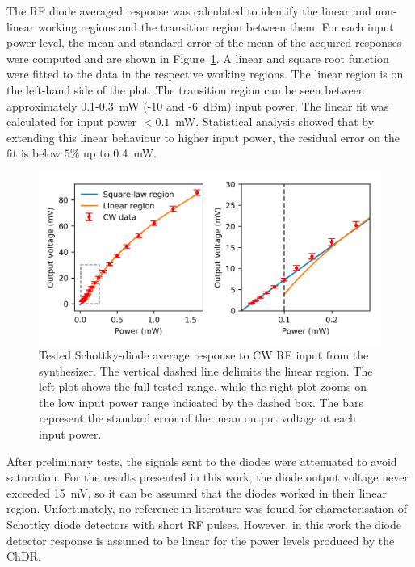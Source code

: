 The RF diode averaged response was calculated to identify the linear and non-linear working regions and the transition region between them. For each input power level, the mean and standard error of the mean of the acquired responses were computed and are shown in Figure~\ref{fig:diode_cal_fits}. A linear and square root function were fitted to the data in the respective working regions. The linear region is on the left-hand side of the plot. The transition region can be seen between approximately 0.1-0.3~mW (-10 and -6~dBm) input power. The linear fit was calculated for input power $<0.1$~mW. Statistical analysis showed that by extending this linear behaviour to higher input power, the residual error on the fit is below $5\%$ up to 0.4~mW.



\begin{figure}[!t]
\centering
\includegraphics[scale=1, keepaspectratio]{pictures/diode_cal_fit3}
\caption{Tested Schottky-diode average response to CW RF input from the synthesizer. The vertical dashed line delimits the linear region. The left plot shows the full tested range, while the right plot zooms on the low input power range indicated by the dashed box. The bars represent the standard error of the mean output voltage at each input power.}
\label{fig:diode_cal_fits}
\end{figure}

After preliminary tests, the signals sent to the diodes were attenuated to avoid saturation. For the results presented in this work, the diode output voltage never exceeded 15~mV, so it can be assumed that the diodes worked in their linear region. Unfortunately, no reference in literature was found for characterisation of Schottky diode detectors with short RF pulses. However, in this work the diode detector response is assumed to be linear for the power levels produced by the ChDR.






